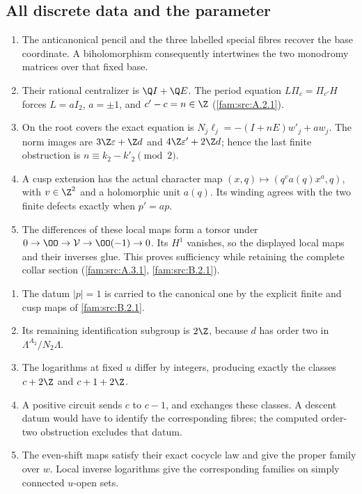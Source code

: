 \subsection{All discrete data and the parameter}
\RungOne
\begin{enumerate}[label=\arabic*.]
\item The anticanonical pencil and the three labelled special fibres
recover the base coordinate. A biholomorphism consequently intertwines
the two monodromy matrices over that fixed base.
\item Their rational centralizer is $\Q I+\Q E$. The period equation
$L\Pi_c=\Pi_{c'}H$ forces $L=aI_2$, $a=\pm1$, and
$c'-c=n\in\Z$ (\ref{fam:src:A.2.1}).
\item On the root covers the exact equation is
$N_j\ell_j=-(I+nE)w'_j+aw_j$.
The norm images are $3\Z\varepsilon+\Z d$ and
$4\Z\varepsilon'+2\Z d$; hence the last finite obstruction is
$n\equiv k_2-k'_2\pmod2$.
\item A cusp extension has the actual character map
$(x,q)\mapsto(q^v a(q)x^a,q)$, with $v\in\Z^2$ and a holomorphic
unit $a(q)$. Its winding agrees with the two finite defects exactly
when $p'=ap$.
\item The differences of these local maps form a torsor under
$0\to\OO\to\mathcal V\to\OO(-1)\to0$.
Its $H^1$ vanishes, so the displayed local maps and their inverses
glue. This proves sufficiency while retaining the complete collar
section (\ref{fam:src:A.3.1}, \ref{fam:src:B.2.1}).
\end{enumerate}

\RungOne
\begin{enumerate}[label=\arabic*.]
\item The datum $|p|=1$ is carried to the canonical one by the
explicit finite and cusp maps of \ref{fam:src:B.2.1}.
\item Its remaining identification subgroup is $2\Z$, because
$d$ has order two in $\Lambda^{A_2}/N_2\Lambda$.
\item The logarithms at fixed $u$ differ by integers, producing
exactly the classes $c+2\Z$ and $c+1+2\Z$.
\item A positive circuit sends $c$ to $c-1$, and exchanges these
classes. A descent datum would have to identify the corresponding
fibres; the computed order-two obstruction excludes that datum.
\item The even-shift maps satisfy their exact cocycle law and give
the proper family over $w$. Local inverse logarithms give the
corresponding families on simply connected $u$-open sets.
\end{enumerate}

